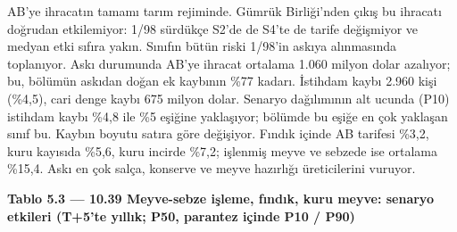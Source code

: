 AB'ye ihracatın tamamı tarım rejiminde. Gümrük Birliği'nden çıkış bu ihracatı doğrudan etkilemiyor: 1/98 sürdükçe S2'de de S4'te de tarife değişmiyor ve medyan etki sıfıra yakın. Sınıfın bütün riski 1/98'in askıya alınmasında toplanıyor. Askı durumunda AB'ye ihracat ortalama 1.060 milyon dolar azalıyor; bu, bölümün askıdan doğan ek kaybının \%77 kadarı. İstihdam kaybı 2.960 kişi (\%4,5), cari denge kaybı 675 milyon dolar. Senaryo dağılımının alt ucunda (P10) istihdam kaybı \%4,8 ile \%5 eşiğine yaklaşıyor; bölümde bu eşiğe en çok yaklaşan sınıf bu. Kaybın boyutu satıra göre değişiyor. Fındık içinde AB tarifesi \%3,2, kuru kayısıda \%5,6, kuru incirde \%7,2; işlenmiş meyve ve sebzede ise ortalama \%15,4. Askı en çok salça, konserve ve meyve hazırlığı üreticilerini vuruyor.


\textbf{Tablo 5.3 --- 10.39 Meyve-sebze işleme, fındık, kuru meyve: senaryo etkileri (T+5'te yıllık; P50, parantez içinde P10 / P90)}

\nopagebreak[4]

\begingroup\gbtablo\footnotesize


